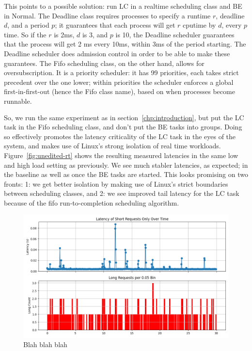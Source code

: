 This points to a possible solution: run LC in a realtime scheduling class and BE
in Normal. The Deadline class requires processes to specify a runtime $r$,
deadline $d$, and a period $p$; it guarantees that each process will get $r$
cputime by $d$, every $p$ time. So if the $r$ is 2ms, $d$ is 3, and $p$ is 10,
the Deadline scheduler guarantees that the process will get 2 ms every 10ms,
within 3ms of the period starting. The Deadline scheduler does admission control
in order to be able to make these guarantees. The Fifo scheduling class, on the
other hand, allows for oversubscription. It is a priority scheduler: it has 99
priorities, each takes strict precedent over the one lower; within priorities
the scheduler enforces a global first-in-first-out (hence the Fifo class name),
based on when processes become runnable.

So, we run the same experiment as in section~\ref{chp:introduction}, but put the
LC task in the Fifo scheduling class, and don't put the BE tasks into groups.
Doing so effectively promotes the latency criticality of the LC task in the eyes
of the system, and makes use of Linux's strong isolation of real time workloads.
Figure~\ref{fig:unedited-rt} shows the resulting measured latencies in the same
low and high load setting as previously. We see much stabler latencies, as
expected; in the baseline as well as once the BE tasks are started. This looks
promising on two fronts: 1: we get better isolation by making use of Linux's
strict boundaries between scheduling classes, and 2: we see improved tail
latency for the LC task because of the fifo run-to-completion scheduling
algorithm.

\begin{figure}[t]
    \centering
    \includegraphics[width=\textwidth]{graphs/hol-blocking.png}
    \caption{Blah blah blah}\label{fig:hol-blocking}
\end{figure}


